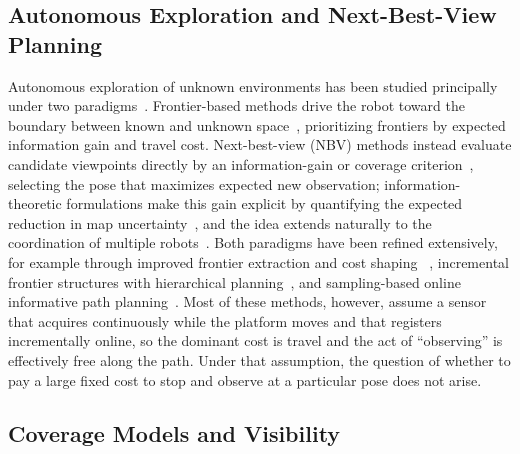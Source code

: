 \documentclass[sensors,article,submit,pdftex,moreauthors]{Definitions/mdpi}
\providecommand{\DIFadd}[1]{{\protect\color{blue} \sf #1}} %
\providecommand{\DIFaddbegin}{} %
\providecommand{\DIFaddend}{} %
\begin{document}
\subsection{Autonomous Exploration and Next-Best-View Planning}

Autonomous exploration of unknown environments has been studied principally
under two paradigms~\cite{placed2023,lluvia2021}. Frontier-based methods drive
the robot toward the boundary between known and unknown
space~\cite{yamauchi1997,umari2017}, prioritizing frontiers by expected
information gain and travel cost. Next-best-view (NBV) methods instead evaluate
candidate viewpoints directly by an information-gain or coverage
criterion~\cite{connolly1985,bircher2016}, selecting the pose that maximizes
expected new observation; information-theoretic formulations make this gain
explicit by quantifying the expected reduction in map
uncertainty~\cite{stachniss2005}, and the idea extends naturally to the
coordination of multiple robots~\cite{burgard2005}. Both paradigms have been
refined extensively, for example through improved frontier extraction and cost
shaping~\cite{he2025,quin2021}\DIFaddbegin \DIFadd{, incremental frontier structures with
hierarchical planning~\cite{zhou2021}, and sampling-based online informative
path planning~\cite{schmid2020}}\DIFaddend . Most of these methods, however, assume a sensor
that acquires continuously while the platform moves and that registers
incrementally online, so the dominant cost is travel and the act of ``observing''
is effectively free along the path. Under that assumption, the question of
whether to pay a large fixed cost to stop and observe at a particular pose does
not arise.

\subsection{Coverage Models and Visibility}
\end{document}
